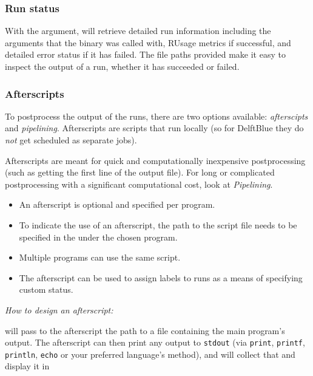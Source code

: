 \documentclass[a4paper,english]{article}
\begin{document}
\begin{adjustwidth}{18pt}{0pt}
            \subsubsection{Run status}
                With the  argument,   will retrieve detailed
                run information including the arguments that the binary was called with, RUsage metrics
                if successful, and detailed error status if it has failed.
                The file paths provided make it easy to inspect the output of a run, whether it has
                succeeded or failed.

            \subsubsection{Afterscripts}
                To postprocess the output of the runs, there are two options available: \emph{afterscipts} and \emph{pipelining}.
                Afterscripts are scripts that run locally (so for DelftBlue they do
                \emph{not} get scheduled as separate jobs).

                Afterscripts are meant for quick and computationally inexpensive postprocessing 
                (such as getting the first line of the output file).
                For long or complicated postprocessing with a significant computational cost, look at \emph{Pipelining}.

                \begin{itemize}
                    \item An afterscript is optional and specified per program. 
                    \item To indicate the use of an afterscript, the path to the script file needs to be specified in the  under the chosen program.
                    \item Multiple programs can use the same script. 
                    \item The afterscript can be used to assign labels to runs as a means of specifying custom status.
                \end{itemize}

                \emph{How to design an afterscript:}

                 will pass to the afterscript the path to a file containing the main program's output.
                The afterscript can then print any output to \texttt{stdout} 
                (via \texttt{print}, \texttt{printf}, \texttt{println}, \texttt{echo} or your preferred language's method),
                and  will collect that and display it in 
                ~~~
                

\end{adjustwidth}
\end{document}
